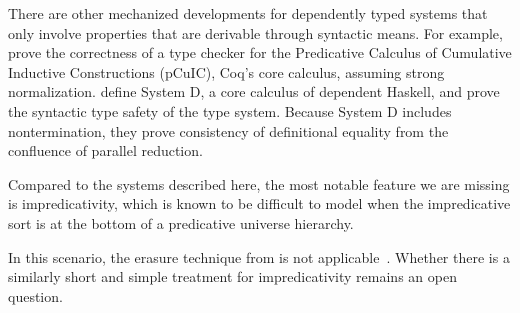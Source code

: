 \documentclass[\ifpublic nolinenum\else\fi,online,OA]{jfp}
\newcommand{\jc}[1]{}
\theoremstyle{definition}
\begin{document}
There are other mechanized developments for dependently typed systems that
only involve properties that are derivable through syntactic means. For
example, \citet{coqcoqcorrect2019} prove the correctness of a type checker
for the Predicative Calculus of Cumulative Inductive Constructions (pCuIC),
Coq's core calculus, assuming strong normalization.
\citet{weirich:systemd} define System D, a core calculus of
dependent Haskell, and prove the syntactic type safety of the type
system. Because System D includes nontermination, they prove
consistency of definitional equality from the confluence of 
parallel reduction.
\jc{Why specifically mention System D? Surely there are other more notable
(in reviewers' eyes) dependent languages for which type safety have been proven?}

Compared to the systems described here, the most notable feature we are
missing is impredicativity, which is known to be
difficult to model when the impredicative sort is at the bottom of a
predicative universe hierarchy.
\jc{This makes it sound like it's easy when it's at the top of a predicative
universe hierarchy, which I don't think is what you meant; did you mean when
impredicativity is combined with some sort of large elimination of base types/
type-level computation?}
In this scenario, the erasure technique from \citet{geuvers1994short} is not
applicable~\citep{abel2013normalization}. Whether there is a similarly short
and simple treatment for impredicativity remains an open question.
\end{document}
